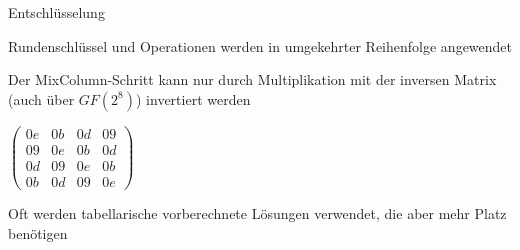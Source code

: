 \documentclass[a4paper]{article}
\begin{document}
\begin{multicols}{3}
      \begin{itemize*}
            \item Entschlüsselung
            \begin{itemize*}
                  \item Rundenschlüssel und Operationen werden in umgekehrter Reihenfolge angewendet
                  \item Der MixColumn-Schritt kann nur durch Multiplikation mit der inversen Matrix (auch über $GF(2^8)$) invertiert werden
                  \item $\begin{pmatrix} 0e&0b&0d&09\\ 09&0e&0b&0d\\ 0d&09&0e&0b\\ 0b&0d&09&0e \end{pmatrix}$
                  \item Oft werden tabellarische vorberechnete Lösungen verwendet, die aber mehr Platz benötigen
            \end{itemize*}
      \end{itemize*}



\end{multicols}
\end{document}
